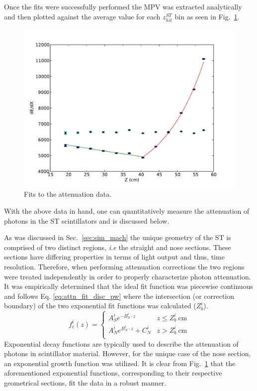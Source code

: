 Once the fits were successfully performed the MPV was extracted analytically and then plotted against the average value for each $z^{ST}_{hit}$ bin as seen in Fig.~\ref{fig:attfits}.
\begin{figure}[!htb]
	\centering
	\includegraphics[width=1.0\columnwidth]{calibration/figs/Att_Fit15}
	\caption{Fits to the attenuation data.}
	\label{fig:attfits}
\end{figure}
With the above data in hand, one can quantitatively measure the attenuation of photons in the ST scintillators and is discussed below.


As was discussed in Sec.~\ref{sec:sim_mach} the unique geometry of the ST is comprised of two distinct regions, \textit{i.e} the straight and nose sections.  These sections have differing properties in terms of light output and thus, time resolution.  Therefore, when performing attenuation corrections the two regions were treated independently in order to properly characterize photon attenuation.  It was empirically determined that the ideal fit function was piecewise continuous and follows Eq. \ref{eq:attn_fit_disc_pw} where the intersection (or correction boundary) of the two exponential fit functions was calculated ($Z^{i}_{b}$).
	\begin{equation} \label{eq:attn_fit_disc_pw}
	f_{c}^{i}(z) = 
	\begin{cases} 
		A^{i}_{S}e^{-B^{i}_{S} \cdot z} & z \leq Z^{i}_{b}\ \mathrm{cm} \\
		A^{i}_{N}e^{B^{i}_{N} \cdot z} + C^{i}_{N} & z > Z^{i}_{b}\ \mathrm{cm} \\
	\end{cases}
	\end{equation}
Exponential decay functions are typically used to describe the attenuation of photons in scintillator material.  However, for the unique case of the nose section, an exponential growth function was utilized.  It is clear from Fig.~\ref{fig:attfits} that the aforementioned exponential functions, corresponding to their respective geometrical sections, fit the data in a robust manner.

